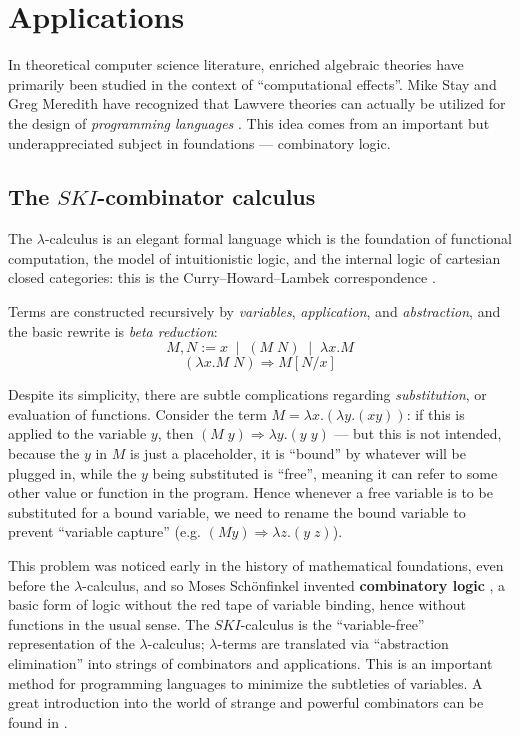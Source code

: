 \documentclass{amsart}
\theoremstyle{definition}
\begin{document}
\section{Applications}

In theoretical computer science literature, enriched algebraic theories have primarily been studied in the context of ``computational effects''. Mike Stay and Greg Meredith have recognized that Lawvere theories can actually be utilized for the design of \textit{programming languages} \cite{ladl}. This idea comes from an important but underappreciated subject in foundations --- combinatory logic.

\subsection{The $SKI$-combinator calculus}

The $\lambda$-calculus is an elegant formal language which is the foundation of functional computation, the model of intuitionistic logic, and the internal logic of cartesian closed categories: this is the Curry--Howard--Lambek correspondence \cite{rosetta}.

Terms are constructed recursively by \textit{variables}, \textit{application}, and \textit{abstraction}, and the basic rewrite is \textit{beta reduction}: $$M,N := x \;\; | \;\; (M\; N) \;\; | \;\; \lambda x.M$$ $$(\lambda x.M\; N) \Rightarrow M[N/x]$$

Despite its simplicity, there are subtle complications regarding \textit{substitution}, or evaluation of functions. Consider the term $M = \lambda x.(\lambda y.(xy))$: if this is applied to the variable $y$, then $(M\; y) \Rightarrow \lambda y.(y\; y)$ --- but this is not intended, because the $y$ in $M$ is just a placeholder, it is ``bound'' by whatever will be plugged in, while the $y$ being substituted is ``free'', meaning it can refer to some other value or function in the program. Hence whenever a free variable is to be substituted for a bound variable, we need to rename the bound variable to prevent ``variable capture'' (e.g. $(M y) \Rightarrow \lambda z.(y\; z)$).

This problem was noticed early in the history of mathematical foundations, even before the $\lambda$-calculus, and so Moses Sch\"onfinkel invented \textbf{combinatory logic} \cite{combs}, a basic form of logic without the red tape of variable binding, hence without functions in the usual sense. The $SKI$-calculus is the ``variable-free'' representation of the $\lambda$-calculus; $\lambda$-terms are translated via ``abstraction elimination'' into strings of combinators and applications. This is an important method for programming languages to minimize the subtleties of variables. A great introduction into the world of strange and powerful combinators can be found in \cite{tmam}.
\end{document}
